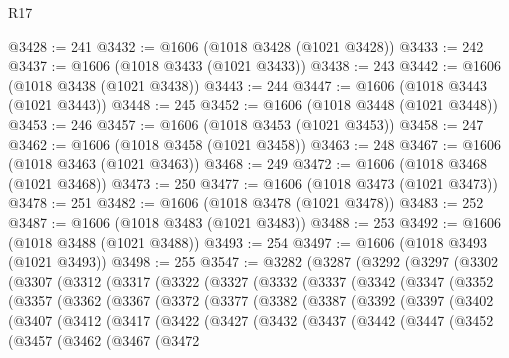 \begin{lexlean}{R17}
\begin{coremodule}
@3428 := 241
@3432 := @1606 (@1018 @3428 (@1021 @3428))
@3433 := 242
@3437 := @1606 (@1018 @3433 (@1021 @3433))
@3438 := 243
@3442 := @1606 (@1018 @3438 (@1021 @3438))
@3443 := 244
@3447 := @1606 (@1018 @3443 (@1021 @3443))
@3448 := 245
@3452 := @1606 (@1018 @3448 (@1021 @3448))
@3453 := 246
@3457 := @1606 (@1018 @3453 (@1021 @3453))
@3458 := 247
@3462 := @1606 (@1018 @3458 (@1021 @3458))
@3463 := 248
@3467 := @1606 (@1018 @3463 (@1021 @3463))
@3468 := 249
@3472 := @1606 (@1018 @3468 (@1021 @3468))
@3473 := 250
@3477 := @1606 (@1018 @3473 (@1021 @3473))
@3478 := 251
@3482 := @1606 (@1018 @3478 (@1021 @3478))
@3483 := 252
@3487 := @1606 (@1018 @3483 (@1021 @3483))
@3488 := 253
@3492 := @1606 (@1018 @3488 (@1021 @3488))
@3493 := 254
@3497 := @1606 (@1018 @3493 (@1021 @3493))
@3498 := 255
@3547 := @3282
    (@3287
      (@3292
        (@3297
          (@3302
            (@3307
              (@3312
                (@3317
                  (@3322
                    (@3327
                      (@3332
                        (@3337
                          (@3342
                            (@3347
                              (@3352
                                (@3357
                                  (@3362
                                    (@3367
                                      (@3372
                                        (@3377
                                          (@3382
                                            (@3387
                                              (@3392
                                                (@3397
                                                  (@3402
                                                    (@3407
                                                      (@3412
                                                        (@3417
                                                          (@3422
                                                            (@3427
                                                              (@3432
                                                                (@3437
                                                                  (@3442
                                                                    (@3447
                                                                      (@3452
                                                                        (@3457
                                                                          (@3462
                                                                            (@3467
                                                                              (@3472

\end{coremodule}
\end{lexlean}
